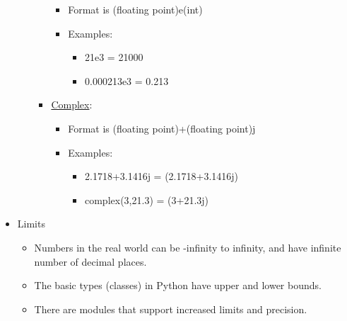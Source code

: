 \documentclass[11pt]{article}
\providecommand{\tightlist}{%
      \setlength{\itemsep}{0pt}\setlength{\parskip}{0pt}}
\begin{document}
\begin{itemize}
\begin{itemize}
\begin{itemize}
      \begin{itemize}
      \tightlist
      \item
        Format is (floating point)e(int)
      \item
        Examples:

        \begin{itemize}
        \tightlist
        \item
          21e3 = 21000
        \item
          0.000213e3 = 0.213
        \end{itemize}
      \end{itemize}
    \item
      \href{https://en.wikipedia.org/wiki/Complex_number}{Complex}:

      \begin{itemize}
      \tightlist
      \item
        Format is (floating point)+(floating point)j
      \item
        Examples:

        \begin{itemize}
        \tightlist
        \item
          2.1718+3.1416j = (2.1718+3.1416j)
        \item
          complex(3,21.3) = (3+21.3j)
        \end{itemize}
      \end{itemize}
    \end{itemize}
  \end{itemize}
\item
  Limits

  \begin{itemize}
  \tightlist
  \item
    Numbers in the real world can be -infinity to infinity, and have
    infinite number of decimal places.
  \item
    The basic types (classes) in Python have upper and lower bounds.
  \item
    There are modules that support increased limits and precision.
  \end{itemize}
\end{itemize}
\end{document}
